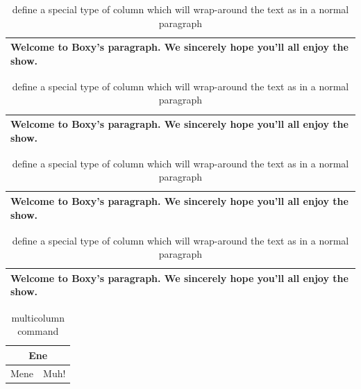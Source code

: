 \begin{table}
    \label{tab:tabular_example4}
    \centering
    \begin{tabular}{|p{4.7cm}|}
        \hline Welcome to Boxy's paragraph. We sincerely hope you'll all enjoy the show.\\
        \hline
    \end{tabular}
    \caption{define a special type of column which will wrap-around the text as in a normal paragraph}
\end{table}

\begin{table}
    \label{tab:tabular_example8}
    \centering
    \begin{tabular}{p{4.7cm}}
        \hline
        Welcome to Boxy's paragraph.
        We sincerely hope you'll all enjoy the show.\\
        \hline
    \end{tabular}
    \caption{define a special type of column which will wrap-around the text as in a normal paragraph}
\end{table}

\begin{table}
    \label{tab:tabular_example5}
    \centering
    \begin{tabular}{@{} l @{}}
        \hline Welcome to Boxy's paragraph. We sincerely hope you'll all enjoy the show.\\
        \hline
    \end{tabular}
    \caption{define a special type of column which will wrap-around the text as in a normal paragraph}
\end{table}

\begin{table}
    \label{tab:tabular_example6}
    \centering
    \begin{tabular}{l}
        \hline Welcome to Boxy's paragraph. We sincerely hope you'll all enjoy the show.\\
        \hline
    \end{tabular}
    \caption{define a special type of column which will wrap-around the text as in a normal paragraph}
\end{table}

\begin{table}
    \label{tab:tabular_example9}
    \centering
    \begin{tabular}{c c} \hline \multicolumn{2}{c}{Ene} \\ \hline Mene & Muh! \\ \hline \end{tabular}
    \caption{multicolumn command}
\end{table}

